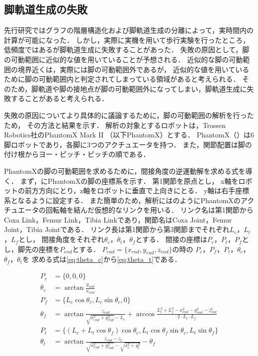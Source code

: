 \subsection{脚軌道生成の失敗}
先行研究ではグラフの階層構造化および脚軌道生成の分離によって，実時間内の計算が可能になった．
しかし，実際に実機を用いて歩行実験を行ったところ，低頻度ではあるが脚軌道生成に失敗することがあった．
失敗の原因として，脚の可動範囲に近似的な値を用いていることが予想される．
近似的な脚の可動範囲の境界近くは，実際には脚の可動範囲外であるが，
近似的な値を用いているために脚の可動範囲内と判定されてしまっている領域があると考えられる．
そのため，脚軌道や脚の接地点が脚の可動範囲外になってしまい，脚軌道生成に失敗することがあると考えられる．

失敗の原因についてより具体的に議論するために，脚の可動範囲の解析を行ったため，
その方法と結果を示す．
解析の対象とするロボットは，Trossen Robotics社のPhantomX Mark I\hspace{-1.2pt}I \cite{cita:phantom_x_mark_2}  %
（以下PhantomX）とする．
PhantomX（）は6脚ロボットであり，各脚に3つのアクチュエータを持つ．
また，関節配置は脚の付け根からヨー・ピッチ・ピッチの順である．

PhantomXの脚の可動範囲を求めるために，間接角度の逆運動解を求める式を導く．
まず，にPhantomXの脚の座標系を示す．
第1関節を原点とし，
x軸をロボットの前方方向にとり，z軸をロボットに垂直で上向きにとる．
y軸は右手座標系となるように設定する．
また簡単のため，解析にはのようにPhantomXのアクチュエータの回転軸を結んだ仮想的なリンクを用いる．
リンク名は第1関節からCoxa Link，Femur Link，Tibia Linkであり，関節名はCoxa Joint，Femur Joint，Tibia Jointである．
リンク長は第1関節から第3関節までそれぞれ$L_c$，$L_t$，$L_f$とし，
間接角度をそれぞれ$\theta_c$，$\theta_t$，$\theta_f$とする．
間接の座標は$P_c$，$P_t$，$P_f$とし，脚先の座標を$P_{end}$とする．
$P_{end} = \{x_{end},y_{end},z_{end}\}$の時の
$P_c$，$P_f$，$P_t$，$\theta_c$，$\theta_f$，$\theta_t$を
求める式は\eqref{eq:theta_c}から\eqref{eq:theta_t}である．

\begin{align}
  P_c &= \{0,0,0\} \label{eq:theta_c} \\
  \theta_c &= \arctan \frac{y_{end}}{x_{end}}  \\
  P_f &= \{L_c \cos \theta_c, L_c \sin \theta_c, 0\}  \\
  \theta_f &= \arctan \frac{z_{end}}{\sqrt{x_{end}^2 + y_{end}^2} - L_c} + 
  \arccos \frac{L_t^2 + L_f^2 - x_{end}^2 - y_{end}^2 - z_{end}^2}{2 \cdot L_t \cdot L_f} \\
  P_t &= \{(L_c + L_t \cos \theta_f)\cos \theta_c ,
                  L_t \cos \theta_f \sin \theta_c , 
                  L_t \sin \theta_f\}  \\
  \theta_t &= \arctan \frac{z_{end} - z_t}{\sqrt{x_{end}^2 + y_{end}^2} - 
              \sqrt{x_t^2 + y_t^2}} - \theta_f \label{eq:theta_t} 
\end{align}

